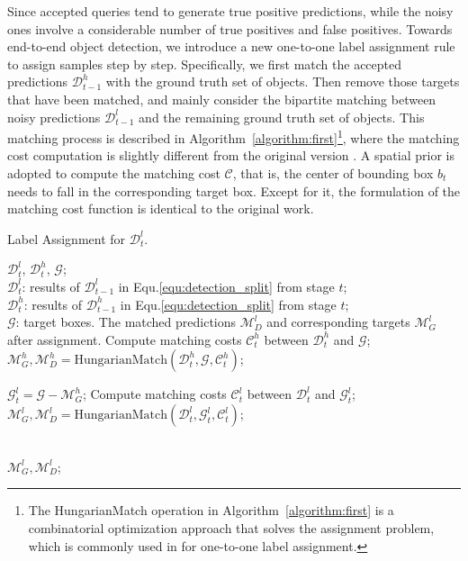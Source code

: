 \documentclass[final]{cvpr}
\begin{document}
Since accepted queries tend to generate true positive predictions, while the noisy ones involve a considerable number of true positives and false positives. Towards end-to-end object detection, we introduce a new one-to-one label assignment rule to assign samples step by step. Specifically, we first match the accepted predictions $\mathcal{D}^{h}_{t-1}$ with the ground truth set of objects. Then remove those targets that have been matched, and mainly consider the bipartite matching between noisy predictions $\mathcal{D}^{l}_{t-1}$ and the remaining ground truth set of objects. This matching process is described in Algorithm~\ref{algorithm:first}\footnote{The HungarianMatch operation in Algorithm~\ref{algorithm:first} is a combinatorial optimization approach that solves the assignment problem, which is commonly used in \cite{carion2020end, sun2020sparse, zhu2021deformable, wang2020end} for one-to-one label assignment.}, where the matching cost computation is slightly different from the original version \cite{sun2020sparse}. A spatial prior is adopted to compute the matching cost $\mathcal{C}$, that is, the center of bounding box $b_t$ needs to fall in the corresponding target box. Except for it, the formulation of the matching cost function is identical to the original work.







\begin{algorithm}[t] 
\caption{Label Assignment for $\mathcal{D}^l_{t}$.} 
\label{alg:yn} 
\begin{algorithmic}[1] 
\Require 
$\mathcal{D}^{l}_{t}$, $ \mathcal{D}^{h}_{t}$, $\mathcal{G}$; \\
 $\mathcal{D}^{l}_{t}$: results of $\mathcal{D}^{l}_{t-1}$ in Equ.\eqref{equ:detection_split} from stage $t$; \\
 $\mathcal{D}^{h}_{t}$:  results of $\mathcal{D}^{h}_{t-1}$ in Equ.\eqref{equ:detection_split} from stage $t$;\\
$\mathcal{G}$: target boxes.
\Ensure 
The matched predictions $\mathcal{M}^{l}_{D}$ and corresponding targets $\mathcal{M}^{l}_G$ after assignment.
\State Compute matching costs $\mathcal{C}^{h}_{t}$ between $\mathcal{D}^{h}_{t}$ and $\mathcal{G}$;
\State $\mathcal{M}^{h}_G, \mathcal{M}^{h}_{D} = \text{HungarianMatch}(\mathcal{D}^{h}_{t}, \mathcal{G}, \mathcal{C}^{h}_{t})$;

\State $\mathcal{G}^{l}_{t} = \mathcal{G} - \mathcal{M}^{h}_G$;
\State Compute matching costs $\mathcal{C}^{l}_{t}$ between $\mathcal{D}^{l}_{t}$ and $\mathcal{G}^{l}_{t}$;
\State $\mathcal{M}^{l}_G, \mathcal{M}^{l}_{D} = \text{HungarianMatch}(\mathcal{D}^{l}_{t}, \mathcal{G}^{l}_{t}, \mathcal{C}^{l}_{t})$;

\\ 
\Return $\mathcal{M}^{l}_G, \mathcal{M}^{l}_{D}$; 
\end{algorithmic}\label{algorithm:first}
\end{algorithm}
\end{document}
